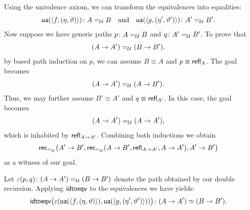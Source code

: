 \begin{solution}
\begin{enumerate}[a),font=\upshape]
\begin{enumerate}
            \bigskip

            Using the univalence axiom, we can transform the equivalences into equalities:
            \[
                \fun{ua}(\dep{f,(\eta,\vartheta)})\colon A\eq\univ B
                \quad\text{and}\quad
                \fun{ua}(\dep{g,(\eta',\vartheta')})\colon A'\eq\univ B'.
            \]
            Now suppose we have generic paths $p\colon A\eq\univ B$ and $q\colon A'\eq\univ B'$. To prove that
            \[
                (A\to A')\mathrel{=_{\mathcal U}}(B\to B'),
            \]
            by based path induction on $p$, we can assume $B\equiv A$ and $p\equiv\mathsf{refl}_A$. The goal becomes
            \[
                (A\to A')\mathrel{=_{\mathcal U}}(A\to B').
            \]
            Thus, we may further assume $B'\equiv A'$ and $q\equiv\mathsf{refl}_{A'}$. In this case, the goal becomes 
            \[
                (A\to A')\mathrel{=_{\mathcal U}}(A\to A'),
            \]
            which is inhabited by $\mathsf{refl}_{A\to A'}$. Combining both inductions we obtain
            \[
                \mathsf{rec}_{\mathrel{=_{\mathcal U}}}
                    \bigl(
                        A'\to B',
                        \mathsf{rec}_{\mathrel{=_{\mathcal U}}}
                            (
                                A\to B',
                                \mathsf{refl}_{A\to A'},
                                A\to A'
                            ),
                        A'\to B'
                    \bigr)
            \]
            as a witness of our goal.
            
            Let $\varepsilon(p,q)\colon(A\to A')\eq\univ(B\to B')$ denote the path obtained by our double recursion. Applying $\mathsf{idtoeqv}$ to the equivalences we have yields:
            \[
                \fun{idtoeqv}\bigl(\varepsilon(
                    \fun{ua}(\dep{
                        f,
                        (\eta,\vartheta)
                    }),
                    \fun{ua}(\dep{
                    g,
                    (\eta',\vartheta')
                    })
                    )\bigr)
                    \colon(A\to A')\simeq(B\to B').
            \]

            \bigskip


\end{enumerate}
\end{enumerate}
\end{solution}

